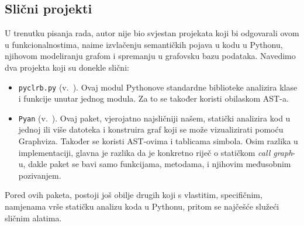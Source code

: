 \subsection{Slični projekti} \label{subsec:slicni}

U trenutku pisanja rada, autor nije bio svjestan projekata
koji bi odgovarali ovom u funkcionalnostima, naime
izvlačenju semantičkih pojava u kodu u Pythonu, njihovom modeliranju
grafom i spremanju u grafovsku bazu podataka. Navedimo
dva projekta koji su donekle slični:

\begin{itemize}

\item \texttt{pyclrb.py} (v.\ \cite{docs:pyclbr}). Ovaj modul Pythonove
standardne biblioteke analizira klase i funkcije unutar jednog modula.
Za to se također koristi obilaskom AST-a.

\item \texttt{Pyan} (v.\ \cite{repo:pyan}). Ovaj paket, vjerojatno
najsličniji našem, statički analizira kod u jednoj ili više datoteka i
konstruira graf koji se može vizualizirati pomoću Graphviza. Također se
koristi AST-ovima i tablicama simbola. Osim razlika u implementaciji,
glavna je razlika da je konkretno riječ o statičkom \emph{call graph}-u,
dakle paket se bavi samo funkcijama, metodama, i njihovim međusobnim
pozivanjem.

\end{itemize}

Pored ovih paketa, postoji još obilje drugih koji s vlastitim, specifičnim,
namjenama vrše statičku analizu koda u Pythonu, pritom se
najčešće služeći sličnim alatima.



